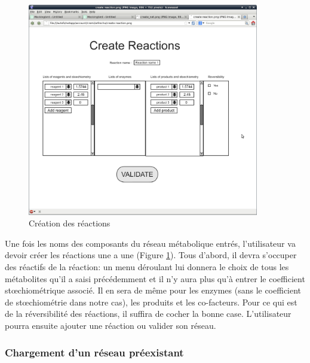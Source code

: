 \begin{figure}[!ht]
	\begin{center}
  		\includegraphics[width=0.90\textwidth]{create_reaction.png}  
  		\caption{Création des réactions}
  		\label{reactions}
	\end{center}
\end{figure}

Une fois les noms des composants du réseau métabolique entrés, l'utilisateur va devoir créer les réactions une a une (Figure \ref{reactions}). Tous d'abord, il devra s'occuper des réactifs de la réaction: un menu déroulant lui donnera le choix de tous les métabolites qu'il a saisi précédemment et il n'y aura plus qu'à entrer le coefficient stœchiométrique associé. Il en sera de même pour les enzymes (sans le coefficient de stœchiométrie dans notre cas), les produits et les co-facteurs. Pour ce qui est de la réversibilité des réactions, il suffira de cocher la bonne case. L'utilisateur pourra ensuite ajouter une réaction ou valider son réseau. 

\pagebreak

\subsubsection{Chargement d'un réseau préexistant}

